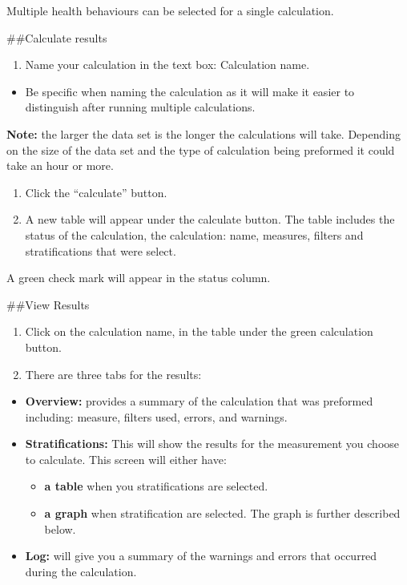 \documentclass[]{book}
\providecommand{\tightlist}{%
  \setlength{\itemsep}{0pt}\setlength{\parskip}{0pt}}
\begin{document}
Multiple health behaviours can be selected for a single calculation.

\#\#Calculate results

\begin{enumerate}
\def\labelenumi{\arabic{enumi}.}
\tightlist
\item
  Name your calculation in the text box: Calculation name.
\end{enumerate}

\begin{itemize}
\tightlist
\item
  Be specific when naming the calculation as it will make it easier to distinguish after running multiple calculations.
\end{itemize}

\textbf{Note:} the larger the data set is the longer the calculations will take. Depending on the size of the data set and the type of calculation being preformed it could take an hour or more.

\begin{enumerate}
\def\labelenumi{\arabic{enumi}.}
\setcounter{enumi}{1}
\item
  Click the ``calculate'' button.
\item
  A new table will appear under the calculate button. The table includes the status of the calculation, the calculation: name, measures, filters and stratifications that were select.
\end{enumerate}

A green check mark will appear in the status column.

\#\#View Results

\begin{enumerate}
\def\labelenumi{\arabic{enumi}.}
\item
  Click on the calculation name, in the table under the green calculation button.
\item
  There are three tabs for the results:
\end{enumerate}

\begin{itemize}
\item
  \textbf{Overview:} provides a summary of the calculation that was preformed including: measure, filters used, errors, and warnings.
\item
  \textbf{Stratifications:} This will show the results for the measurement you choose to calculate. This screen will either have:

  \begin{itemize}
  \tightlist
  \item
    \textbf{a table} when you stratifications are selected.
  \item
    \textbf{a graph} when stratification are selected. The graph is further described below.
  \end{itemize}
\item
  \textbf{Log:} will give you a summary of the warnings and errors that occurred during the calculation.
\end{itemize}
\end{document}
